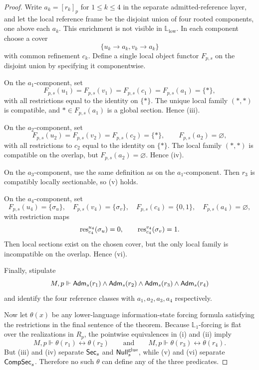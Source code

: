 \begin{proof}
Write $a_k=[r_k]_p$ for $1\le k\le 4$ in the separate admitted-reference layer,
and let the local reference frame be the disjoint union of four rooted
components, one above each $a_k$. This enrichment is not visible in
$\mathbb L_{\mathrm{low}}$. In each component choose a cover
\[
\{u_k\to a_k,v_k\to a_k\}
\]
with common refinement $c_k$. Define a single local object functor $F_{p,s}$ on the disjoint union by specifying it componentwise.

On the $a_1$-component, set
\[
F_{p,s}(u_1)=F_{p,s}(v_1)=F_{p,s}(c_1)=F_{p,s}(a_1)=\{*\},
\]
with all restrictions equal to the identity on $\{*\}$. The unique local family $(*,*)$ is compatible, and $*\in F_{p,s}(a_1)$ is a global section. Hence \textup{(iii)}.

On the $a_2$-component, set
\[
F_{p,s}(u_2)=F_{p,s}(v_2)=F_{p,s}(c_2)=\{*\},
\qquad
F_{p,s}(a_2)=\varnothing,
\]
with all restrictions to $c_2$ equal to the identity on $\{*\}$. The local family $(*,*)$ is compatible on the overlap, but $F_{p,s}(a_2)=\varnothing$. Hence \textup{(iv)}.

On the $a_3$-component, use the same definition as on the $a_1$-component. Then $r_3$ is compatibly locally sectionable, so \textup{(v)} holds.

On the $a_4$-component, set
\[
F_{p,s}(u_4)=\{\sigma_u\},\quad
F_{p,s}(v_4)=\{\sigma_v\},\quad
F_{p,s}(c_4)=\{0,1\},\quad
F_{p,s}(a_4)=\varnothing,
\]
with restriction maps
\[
\mathrm{res}_{c_4}^{u_4}(\sigma_u)=0,
\qquad
\mathrm{res}_{c_4}^{v_4}(\sigma_v)=1.
\]
Then local sections exist on the chosen cover, but the only local family is incompatible on the overlap. Hence \textup{(vi)}.

Finally, stipulate
\[
M,p\Vdash \mathsf{Adm}_s(r_1)\land \mathsf{Adm}_s(r_2)\land \mathsf{Adm}_s(r_3)\land \mathsf{Adm}_s(r_4)
\]
and identify the four reference classes with $a_1,a_2,a_3,a_4$ respectively.

Now let $\theta(x)$ be any lower-language information-state forcing formula satisfying the restrictions in the final sentence of the theorem. Because $\mathbb{L}_1$-forcing is flat over the realizations in $R_p$, the pointwise equivalences in \textup{(i)} and \textup{(ii)} imply
\[
M,p\Vdash \theta(r_1)\leftrightarrow\theta(r_2)
\qquad\text{and}\qquad
M,p\Vdash \theta(r_3)\leftrightarrow\theta(r_4).
\]
But \textup{(iii)} and \textup{(iv)} separate $\mathsf{Sec}_s$ and $\mathsf{Null}^{\mathrm{glue}}_s$, while \textup{(v)} and \textup{(vi)} separate $\mathsf{CompSec}_s$. Therefore no such $\theta$ can define any of the three predicates.
\end{proof}
